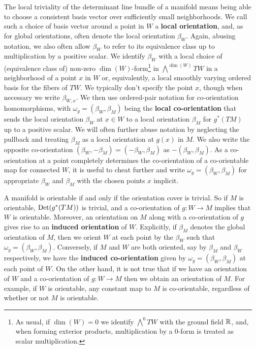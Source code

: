 The local triviality of the determinant
line bundle of a manifold means being able to choose a consistent basis vector
over sufficiently small neighborhoods.
We call such a choice of basis vector around a point
in $W$ a {\bf local orientation}, and, as for global orientations, often denote the local orientation $\beta_W$.
Again, abusing notation, we also often allow $\beta_W$ to refer to its equivalence class up to multiplication by a positive scalar.
We identify $\beta_W$ with a local choice of (equivalence class of) non-zero $\dim(W)$-form\footnote{As usual, if $\dim(W)=0$ we identify $\bigwedge^0 TW$ with the ground field $\mathbb{R}$, and, when forming exterior products, multiplication by a $0$-form is treated as scalar multiplication.} in $\bigwedge^{\dim(W)}TW$ in a neighborhood of a point $x$ in $W$ or, equivalently, a local smoothly varying ordered basis for the fibers of $TW$.
We typically don't specify the point $x$, though when necessary we write $\beta_{W,x}$.
We then use ordered-pair notation for co-orientation homomorphisms,
with $\omega_g = (\beta_W, \beta_M)$ being the \textbf{local co-orientation} that sends
the local orientation $\beta_W$ at $x\in W$ to a local orientation $\beta_M$ for $g^*(TM)$ up to a positive scalar.
We will often further abuse notation by neglecting the pullback and treating $\beta_M$ as a local orientation at $g(x)$ in $M$.
We also write the opposite co-orientation $(\beta_W,-\beta_M)=(-\beta_W,\beta_M)$ as $-(\beta_W,\beta_M)$.
As a co-orientation at a point completely determines the co-orientation of a co-orientable map for connected $W$, it is useful to cheat further and write $\omega_g=(\beta_W,\beta_M)$ for appropriate $\beta_W$ and $\beta_M$ with the chosen points $x$ implicit.

A manifold is orientable if and only if the orientation cover is trivial.
So if $M$ is orientable, ${\rm Det}(g^*(TM))$ is trivial, and a co-orientation
of $g: W \to M$ implies that $W$ is orientable.
Moreover, an orientation on $M$ along with a co-orientation of $g$ gives rise to an \textbf{induced orientation} of $W$.
Explicitly, if $\beta_M$ denotes the global orientation of $M$, then we orient $W$ at each point by the $\beta_W$ such that $\omega_g=(\beta_W,\beta_M)$.
Conversely, if $M$ and $W$ are both oriented, say by $\beta_M$ and $\beta_W$ respectively, we have the \textbf{induced co-orientation} given by $\omega_g=(\beta_W,\beta_M)$ at each point of $W$.
On the other hand, it is not true that if we have an orientation of $W$ and a co-orientation of $g:W\to M$ then we obtain an orientation of $M$.
For example, if $W$ is orientable, any constant map to $M$ is co-orientable, regardless of whether or not $M$ is orientable.

